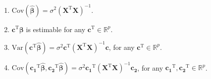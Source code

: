 \documentclass[11pt]{article}
\begin{document}
\begin{enumerate}
\begin{enumerate}
\item $\mathrm{Cov}(\widehat{\bm{\beta}}) = \sigma^{2}(\bm{X}^{\mathrm{T}}\bm{X})^{-1}$.
\item $\bm{c}^{\mathrm{T}}\bm{\beta}$ is estimable for any $\bm{c}^{\mathrm{T}}\in \mathbb{R}^{p}$. \item $\mathrm{Var}(\bm{c}^{\mathrm{T}}\widehat{\bm{\beta}}) = \sigma^{2}\bm{c}^{\mathrm{T}}(\bm{X}^{\mathrm{T}}\bm{X})^{-1}\bm{c}$, for any $\bm{c}^{\mathrm{T}}\in \mathbb{R}^{p}$.
\item $\mathrm{Cov}(\bm{c_{1}}^{\mathrm{T}}\widehat{\bm{\beta}}, \bm{c_{2}}^{\mathrm{T}}\widehat{\bm{\beta}}) = \sigma^{2}\bm{c_{1}}^{\mathrm{T}}(\bm{X}^{\mathrm{T}}\bm{X})^{-1}\bm{c_{2}}$, for any $\bm{c_{1}}^{\mathrm{T}}, \bm{c_{2}}^{\mathrm{T}}\in \mathbb{R}^{p}$.
\end{enumerate} 
%

%
\end{enumerate}
%
%
%
%
%
%
%
%
\end{document}
